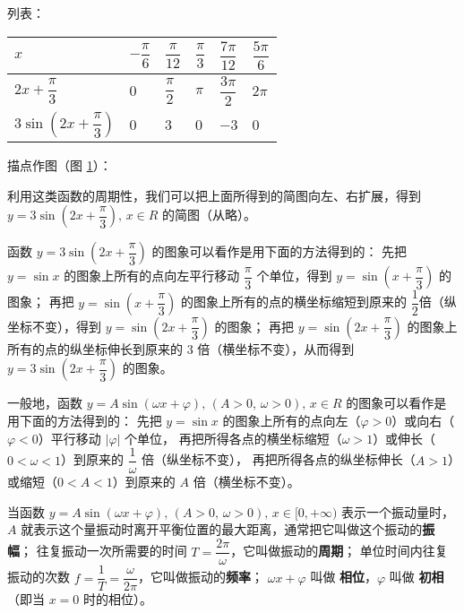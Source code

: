 列表：

\begin{table}[H]
\renewcommand\arraystretch{2}
\begin{tabular}{|w{c}{8em}|*{5}{w{c}{3em}|}}
    \hline
    $x$ & $-\dfrac \pi 6$ & $\dfrac{\pi}{12}$ & $\dfrac{\pi}{3}$ & $\dfrac{7\pi}{12}$ & $\dfrac{5\pi}{6}$ \\ \hline
    $2x + \dfrac \pi 3$ & $0$ & $\dfrac \pi 2$ & $\pi$ & $\dfrac{3\pi}{2}$ & $2\pi$ \\ \hline
    $3\sin \left( 2x + \dfrac \pi 3 \right)$ & $0$ & $3$ & $0$ & $-3$ & $0$ \\ \hline
\end{tabular}
\end{table}

描点作图（图 \ref{fig:2-26}）：

\begin{figure}[htbp]
    \centering
    
    \caption{}\label{fig:2-26}
\end{figure}


利用这类函数的周期性，我们可以把上面所得到的简图向左、右扩展，得到
$y = 3\sin \left( 2x + \dfrac \pi 3 \right), \, x \in R$ 的简图（从略）。

函数 $y = 3\sin \left( 2x + \dfrac \pi 3 \right)$ 的图象可以看作是用下面的方法得到的：
先把 $y = \sin x$ 的图象上所有的点向左平行移动 $\dfrac \pi 3$ 个单位，得到 $y = \sin \left( x + \dfrac \pi 3 \right)$ 的图象；
再把 $y = \sin \left( x + \dfrac \pi 3 \right)$ 的图象上所有的点的横坐标缩短到原来的 $\dfrac 1 2$倍（纵坐标不变），得到 $y = \sin \left( 2x + \dfrac \pi 3 \right)$ 的图象；
再把 $y = \sin \left( 2x + \dfrac \pi 3 \right)$ 的图象上所有的点的纵坐标伸长到原来的 $3$ 倍（横坐标不变），从而得到 $y = 3\sin \left( 2x + \dfrac \pi 3 \right)$ 的图象。
\vspace{0.5em}

一般地，函数 $y = A \sin(\omega x + \varphi), \, (A > 0, \, \omega > 0), \, x \in R$
的图象可以看作是用下面的方法得到的：
先把 $y = \sin x$ 的图象上所有的点向左（$\varphi > 0$）或向右（$\varphi < 0$）平行移动 $|\varphi|$ 个单位，
\vspace{0.5em} 再把所得各点的横坐标缩短（$\omega > 1$）或伸长（$0 < \omega < 1$）到原来的 $\dfrac 1 \omega$ 倍（纵坐标不变），
\vspace{0.5em} 再把所得各点的纵坐标伸长（$A > 1$）或缩短（$0 < A < 1$）到原来的 $A$ 倍（横坐标不变）。

当函数 $y = A \sin(\omega x + \varphi), \, (A > 0, \, \omega > 0), \, x \in [0, +\infty)$ \vspace{0.5em}
表示一个振动量时，$A$ 就表示这个量振动时离开平衡位置的最大距离，通常把它叫做这个振动的\textbf{振幅}；
往复振动一次所需要的时间 $T = \dfrac{2\pi}{\omega}$，它叫做振动的\textbf{周期}；
单位时间内往复振动的次数 $f = \dfrac 1 T = \dfrac{\omega}{2\pi}$，它叫做振动的\textbf{频率}；\vspace{0.5em}
$\omega x + \varphi$ 叫做 \textbf{相位}，$\varphi$ 叫做 \textbf{初相}（即当 $x = 0$ 时的相位）。

